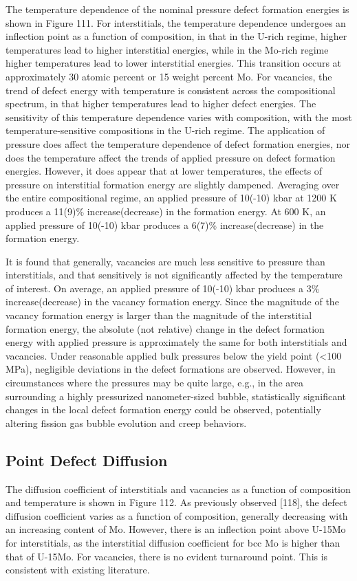 \documentclass[11pt, oneside]{elsarticle}
\begin{document}
The temperature dependence of the nominal pressure defect formation energies is shown in Figure 111. For interstitials, the temperature dependence undergoes an inflection point as a function of composition, in that in the U-rich regime, higher temperatures lead to higher interstitial energies, while in the Mo-rich regime higher temperatures lead to lower interstitial energies. This transition occurs at approximately 30 atomic percent or 15 weight percent Mo. For vacancies, the trend of defect energy with temperature is consistent across the compositional spectrum, in that higher temperatures lead to higher defect energies. The sensitivity of this temperature dependence varies with composition, with the most temperature-sensitive compositions in the U-rich regime. The application of pressure does affect the temperature dependence of defect formation energies, nor does the temperature affect the trends of applied pressure on defect formation energies. However, it does appear that at lower temperatures, the effects of pressure on interstitial formation energy are slightly dampened. Averaging over the entire compositional regime, an applied pressure of 10(-10) kbar at 1200 K produces a 11(9)\% increase(decrease) in the formation energy. At 600 K, an applied pressure of 10(-10) kbar produces a 6(7)\% increase(decrease) in the formation energy. 

It is found that generally, vacancies are much less sensitive to pressure than interstitials, and that sensitively is not significantly affected by the temperature of interest. On average, an applied pressure of 10(-10) kbar produces a 3\% increase(decrease) in the vacancy formation energy. Since the magnitude of the vacancy formation energy is larger than the magnitude of the interstitial formation energy, the absolute (not relative) change in the defect formation energy with applied pressure is approximately the same for both interstitials and vacancies. Under reasonable applied bulk pressures below the yield point (<100 MPa), negligible deviations in the defect formations are observed. However, in circumstances where the pressures may be quite large, e.g., in the area surrounding a highly pressurized nanometer-sized bubble, statistically significant changes in the local defect formation energy could be observed, potentially altering fission gas bubble evolution and creep behaviors.

\subsection{Point Defect Diffusion}
The diffusion coefficient of interstitials and vacancies as a function of composition and temperature is shown in Figure 112. As previously observed [118], the defect diffusion coefficient varies as a function of composition, generally decreasing with an increasing content of Mo. However, there is an inflection point above U-15Mo for interstitials, as the interstitial diffusion coefficient for bcc Mo is higher than that of U-15Mo. For vacancies, there is no evident turnaround point. This is consistent with existing literature. 
\end{document}
